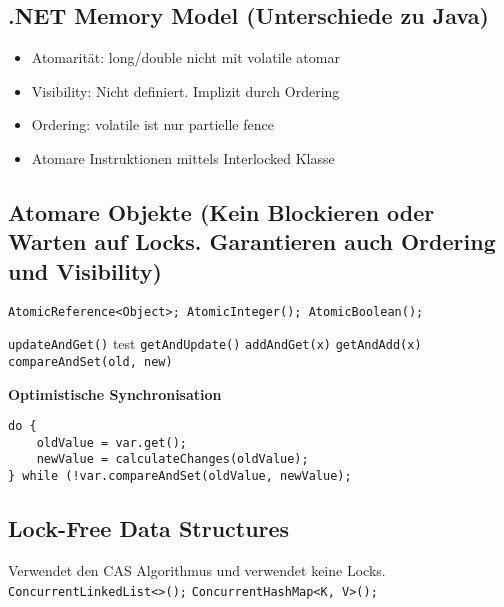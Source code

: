 \subsection{.NET Memory Model (Unterschiede zu Java)}
\begin{itemize}
	\itemsep -0.2em
	\item Atomarität: long/double nicht mit volatile atomar
	\item Visibility: Nicht definiert. Implizit durch Ordering
	\item Ordering: volatile ist nur partielle fence
	\item Atomare Instruktionen mittels Interlocked Klasse
\end{itemize}

\subsection{Atomare Objekte (Kein Blockieren oder Warten auf Locks. Garantieren auch Ordering und Visibility)}

\begin{lstlisting}[style=java]
AtomicReference<Object>; AtomicInteger(); AtomicBoolean();
\end{lstlisting}

\lstinline|updateAndGet()| test
\lstinline|getAndUpdate()|
\lstinline|addAndGet(x)|
\lstinline|getAndAdd(x)|
\lstinline|compareAndSet(old, new)|

\textbf{Optimistische Synchronisation}
\begin{lstlisting}[style=java]
do {
	oldValue = var.get();
	newValue = calculateChanges(oldValue);
} while (!var.compareAndSet(oldValue, newValue);
\end{lstlisting}

\subsection{Lock-Free Data Structures}
Verwendet den CAS Algorithmus und verwendet keine Locks. \\
\lstinline|ConcurrentLinkedList<>();|
\lstinline|ConcurrentHashMap<K, V>();|

